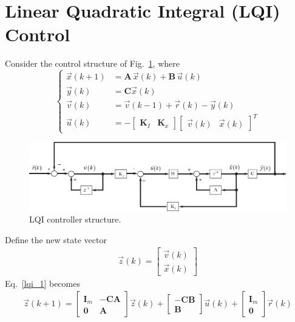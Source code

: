 \documentclass[11pt,a4paper,oneside]{book}
\numberwithin{equation}{section}
\theoremstyle{it}
\theoremstyle{definition}
\begin{document}
\section{Linear Quadratic Integral (LQI) Control}
Consider the control structure of Fig.~\ref{figure_lqi1}, where
\begin{equation}\label{lqi_1}
	\left\lbrace \begin{aligned}
		\vec{x}(k+1) &= \mathbf{A}\,\vec{x}(k)+\mathbf{B}\,\vec{u}(k) \\[6pt]
		\vec{y}(k) &= \mathbf{C}\vec{x}(k) \\[6pt]
		\vec{v}(k) &= \vec{v}(k-1) + \vec{r}(k)-\vec{y}(k) \\[6pt]
		\vec{u}(k) &= -\begin{bmatrix} \mathbf{K}_I & \mathbf{K}_x 
		\end{bmatrix} \begin{bmatrix} \vec{v}(k) & \vec{x}(k) \end{bmatrix}^T
	\end{aligned}\right. 
\end{equation}
\begin{figure}[H]
	\centering
	\includegraphics[width = 450pt, 
	keepaspectratio]{figures/optimal_control/lqi_1.eps}
	\captionsetup{width=0.5\textwidth, font=small}
	\caption{LQI controller structure.}
	\label{figure_lqi1}
\end{figure}
Define the new state vector
\begin{equation}\label{lqi_2}
	\begin{aligned}
		\vec{z}(k) = \begin{bmatrix}  \vec{v}(k) \\ \vec{x}(k)\end{bmatrix}
	\end{aligned} 
\end{equation}
Eq.~\eqref{lqi_1} becomes
\begin{equation}\label{lqi_3}
	\begin{aligned}
		\vec{z}(k+1) = \begin{bmatrix}  \mathbf{I}_m & -\mathbf{CA} \\[6pt] 
			\mathbf{0} & \mathbf{A} \end{bmatrix} \vec{z}(k) + \begin{bmatrix}  
			-\mathbf{CB} \\[6pt] \mathbf{B} \end{bmatrix} \vec{u}(k) + 
		\begin{bmatrix} \mathbf{I}_m \\ \mathbf{0} \end{bmatrix} \vec{r}(k)
	\end{aligned} 
\end{equation}
\end{document}
